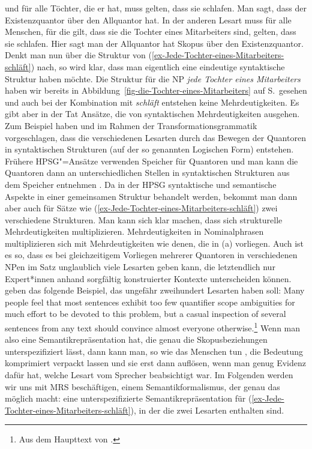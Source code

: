 und für alle Töchter, die er hat, muss gelten, dass sie schlafen. Man sagt, dass der Existenzquantor
 über den Allquantor hat. In der anderen Lesart muss für alle
Menschen, für die gilt, dass sie die Tochter eines Mitarbeiters sind, gelten, dass sie
schlafen. Hier sagt man der Allquantor hat Skopus über den Existenzquantor. Denkt man nun über die
Struktur von (\ref{ex-Jede-Tochter-eines-Mitarbeiters-schläft}) nach, so wird klar, dass man eigentlich eine eindeutige syntaktische
Struktur haben möchte. Die Struktur für die NP \emph{jede Tochter eines Mitarbeiters} haben wir
bereits in Abbildung~\ref{fig-die-Tochter-eines-Mitarbeiters} auf
S.\,\pageref{fig-die-Tochter-eines-Mitarbeiters} gesehen und auch bei der Kombination mit
\emph{schläft} entstehen keine Mehrdeutigkeiten. Es gibt aber in der Tat Ansätze, die
von syntaktischen Mehrdeutigkeiten ausgehen. Zum Beispiel haben \citet{Chomsky76a-u} und
\citet{May77a-u,May85a-u} im Rahmen der Transformationsgrammatik \citep{Chomsky57a,Chomsky81a} vorgeschlagen, dass die verschiedenen Lesarten durch das Bewegen der Quantoren in
syntaktischen Strukturen (auf der so genannten Logischen Form) entstehen. Frühere HPSG"=Ansätze
verwenden Speicher für Quantoren und man kann die Quantoren dann an unterschiedlichen Stellen in
syntaktischen Strukturen aus dem Speicher entnehmen \parencites{Cooper83}[Kapitel~8]{ps2}. Da in der
HPSG syntaktische und semantische Aspekte in einer gemeinsamen Struktur behandelt werden, bekommt
man dann aber auch für Sätze wie (\ref{ex-Jede-Tochter-eines-Mitarbeiters-schläft}) zwei verschiedene Strukturen. Man kann sich klar machen, dass sich strukturelle
Mehrdeutigkeiten multiplizieren. Mehrdeutigkeiten in Nominalphrasen multiplizieren sich mit
Mehrdeutigkeiten wie denen, die in (a) vorliegen. Auch ist es so, dass es bei gleichzeitigem
Vorliegen mehrerer Quantoren in verschiedenen NPen im Satz unglaublich viele Lesarten geben kann, die
letztendlich nur Expert*innen anhand sorgfältig konstruierter Kontexte unterscheiden
können. \citet[]{ADKMNT2003a} geben das folgende Beispiel, das ungefähr zweihundert Lesarten haben soll:
\ea
Many people feel that most sentences exhibit too few quantifier scope ambiguities for much effort to be devoted
to this problem, but a casual inspection of several sentences from any text should convince almost everyone
otherwise.\footnote{%
  Aus dem Haupttext von .
}
\z
Wenn
man also eine Semantikrepräsentation hat, die genau die Skopusbeziehungen unterspezifiziert lässt, dann kann
man, so wie das Menschen tun \citep{FBF2002a-u,Dwivedi2013a-u,Frances2024a-u}, 
die Bedeutung komprimiert verpackt lassen und sie erst dann
auflösen, wenn man genug Evidenz dafür hat, welche Lesart vom Sprecher beabsichtigt war.
Im Folgenden werden wir uns mit MRS beschäftigen, einem Semantikformalismus, der genau das möglich
macht: eine unterspezifizierte Semantikrepräsentation für (\ref{ex-Jede-Tochter-eines-Mitarbeiters-schläft}), in der die zwei Lesarten
enthalten sind.

